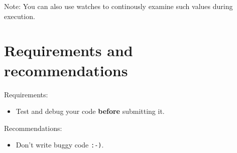 Note: You can also use watches to continously examine such values during 
execution.


\section{Requirements and recommendations}
\label{sec:debugging_req_and_rec}

\noindent
Requirements:
\begin{itemize}
   \item Test and debug your code \textbf{before} submitting it.
\end{itemize}

\noindent
Recommendations:
\begin{itemize}
   \item Don't write buggy code \texttt{:-)}.
\end{itemize}


